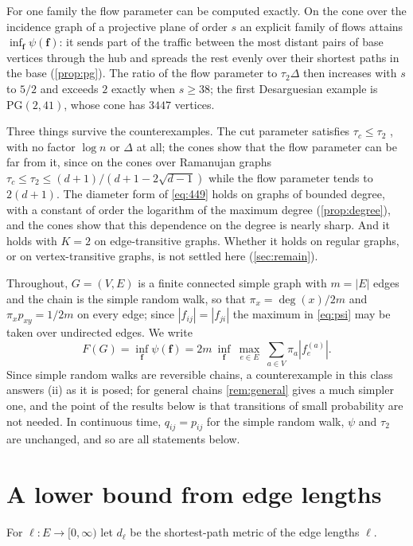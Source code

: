 \documentclass[11pt]{amsart}
\theoremstyle{definition}
\newcommand{\bfF}{\mathbf{f}}
\newcommand{\PG}{\mathrm{PG}}
\begin{document}
For one family the flow parameter can be computed exactly. On the cone over the incidence graph of a projective plane of order $s$ an explicit family of flows attains $\inf_{\bfF}\psi(\bfF)$: it sends part of the traffic between the most distant pairs of base vertices through the hub and spreads the rest evenly over their shortest paths in the base (\cref{prop:pg}). The ratio of the flow parameter to $\tau_2\Delta$ then increases with $s$ to $5/2$ and exceeds $2$ exactly when $s\ge38$; the first Desarguesian example is $\PG(2,41)$, whose cone has $3447$ vertices.

Three things survive the counterexamples. The cut parameter satisfies $\tau_c\le\tau_2$ \cite[Corollary~4.37]{AF}, with no factor $\log n$ or $\Delta$ at all; the cones show that the flow parameter can be far from it, since on the cones over Ramanujan graphs $\tau_c\le\tau_2\le(d+1)/(d+1-2\sqrt{d-1})$ while the flow parameter tends to $2(d+1)$. The diameter form of \eqref{eq:449} holds on graphs of bounded degree, with a constant of order the logarithm of the maximum degree (\cref{prop:degree}), and the cones show that this dependence on the degree is nearly sharp. And it holds with $K=2$ on edge-transitive graphs. Whether it holds on regular graphs, or on vertex-transitive graphs, is not settled here (\cref{sec:remain}).

Throughout, $G=(V,E)$ is a finite connected simple graph with $m=|E|$ edges and the chain is the simple random walk, so that $\pi_x=\deg(x)/2m$ and $\pi_xp_{xy}=1/2m$ on every edge; since $|f_{ij}|=|f_{ji}|$ the maximum in \eqref{eq:psi} may be taken over undirected edges. We write
\begin{equation}\label{eq:F}
F(G)=\inf_{\bfF}\psi(\bfF)=2m\ \inf_{\bfF}\ \max_{e\in E}\ \sum_{a\in V}\pi_a|f^{(a)}_e| .
\end{equation}
Since simple random walks are reversible chains, a counterexample in this class answers (ii) as it is posed; for general chains \cref{rem:general} gives a much simpler one, and the point of the results below is that transitions of small probability are not needed. In continuous time, $q_{ij}=p_{ij}$ for the simple random walk, $\psi$ and $\tau_2$ are unchanged, and so are all statements below.

\section{A lower bound from edge lengths}

For $\ell:E\to[0,\infty)$ let $d_\ell$ be the shortest-path metric of the edge lengths $\ell$.
\end{document}
